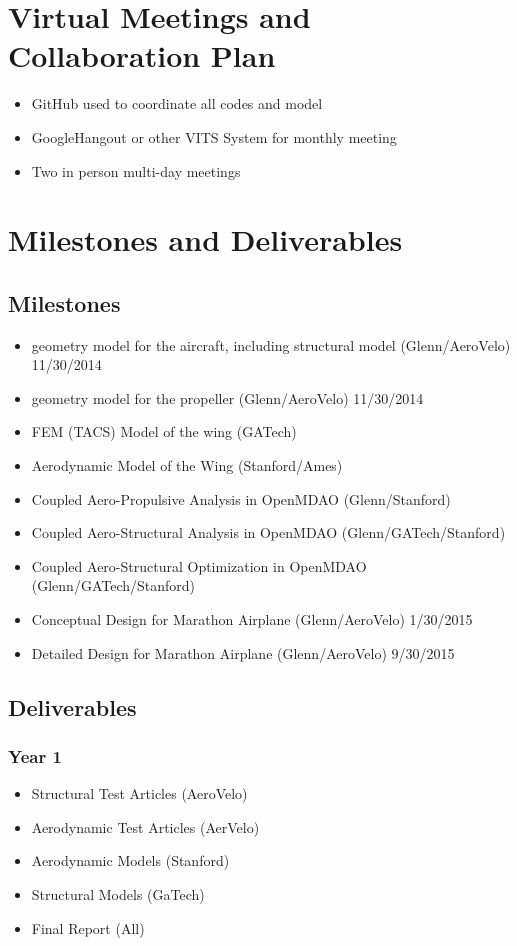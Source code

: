 \documentclass[]{aiaa-tc}
\begin{document}
\section{Virtual Meetings and Collaboration Plan}
    \begin{itemize}
        \item GitHub used to coordinate all codes and model 
        \item GoogleHangout or other VITS System for monthly meeting
        \item Two in person multi-day meetings
    \end{itemize}

\section{Milestones and Deliverables}
    \subsection{Milestones}
        \begin{itemize}
            \item geometry model for the aircraft, including structural model (Glenn/AeroVelo) 11/30/2014
            \item geometry model for the propeller (Glenn/AeroVelo) 11/30/2014
            \item FEM (TACS) Model of the wing (GATech) 
            \item Aerodynamic Model of the Wing (Stanford/Ames)
            \item Coupled Aero-Propulsive Analysis in OpenMDAO (Glenn/Stanford)
            \item Coupled Aero-Structural Analysis in OpenMDAO (Glenn/GATech/Stanford) 
            \item Coupled Aero-Structural Optimization in OpenMDAO (Glenn/GATech/Stanford)
            \item Conceptual Design for Marathon Airplane (Glenn/AeroVelo) 1/30/2015
            \item Detailed Design for Marathon Airplane (Glenn/AeroVelo) 9/30/2015
        \end{itemize}

    \subsection{Deliverables}
        \subsubsection{Year 1}
            \begin{itemize}
                \item Structural Test Articles (AeroVelo)
                \item Aerodynamic Test Articles (AerVelo)
                \item Aerodynamic Models (Stanford)
                \item Structural Models (GaTech)
                \item Final Report (All)
            \end{itemize}
\end{document}
